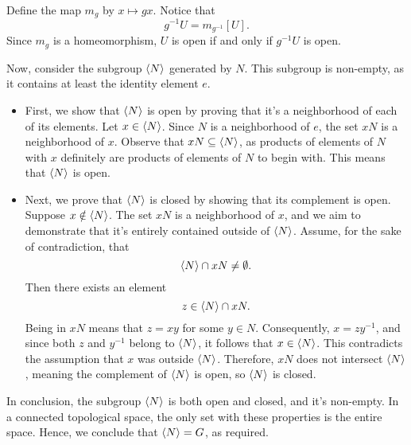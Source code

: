 \documentclass[12pt]{memoir}
\begin{document}
\begin{ptcbp}
Define the map $m_g$ by $x\mapsto gx$. Notice that 
$$g^{-1}U = m_{g^{-1}}[U].$$ 
Since $m_g$ is a homeomorphism, $U$ is open if and only if $g^{-1}U$ is open.
\end{ptcbp}

\begin{ptcbr}
Now, consider the subgroup $\left\langle N\right\rangle$ generated by $N$. This subgroup is non-empty, as it contains at least the identity element $e$.

\begin{itemize}
    \item First, we show that $\left\langle N\right\rangle$ is open by proving that it's a neighborhood of each of its elements. Let $x \in \left\langle N\right\rangle$. Since $N$ is a neighborhood of $e$, the set $xN$ is a neighborhood of $x$. Observe that $xN \subseteq \left\langle N\right\rangle$, as products of elements of $N$ with $x$ definitely are products of elements of $N$ to begin with. This means that $\left\langle N\right\rangle$ is open.
    
    \item Next, we prove that $\left\langle N\right\rangle$ is closed by showing that its complement is open. Suppose $x \notin \left\langle N\right\rangle$. The set $xN$ is a neighborhood of $x$, and we aim to demonstrate that it's entirely contained outside of $\left\langle N\right\rangle$. Assume, for the sake of contradiction, that 
    $$\left\langle N\right\rangle \cap xN \neq \emptyset.$$
    Then there exists an element 
    $$z \in \left\langle N\right\rangle \cap xN.$$
    Being in $xN$ means that $z = xy$ for some $y \in N$. Consequently, $x = zy^{-1}$, and since both $z$ and $y^{-1}$ belong to $\left\langle N\right\rangle$, it follows that $x \in \left\langle N\right\rangle$. This contradicts the assumption that $x$ was outside $\left\langle N\right\rangle$. Therefore, $xN$ does not intersect $\left\langle N\right\rangle$, meaning the complement of $\left\langle N\right\rangle$ is open, so $\left\langle N\right\rangle$ is closed.
\end{itemize}

In conclusion, the subgroup $\left\langle N\right\rangle$ is both open and closed, and it's non-empty. In a connected topological space, the only set with these properties is the entire space. Hence, we conclude that $\left\langle N\right\rangle = G$, as required.
\end{ptcbr}
\end{document}
